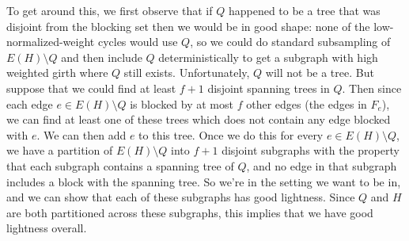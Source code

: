\documentclass{article}
\theoremstyle{plain}
\theoremstyle{definition}
\begin{document}
To get around this, we first observe that if $Q$ happened to be a tree that was disjoint from the blocking set then we would be in good shape:  none of the low-normalized-weight cycles would use $Q$, so we could do standard subsampling of $E(H) \setminus Q$ and then include $Q$ deterministically to get a subgraph with high weighted girth where $Q$ still exists. Unfortunately, $Q$ will not be a tree.  But suppose that we could find at least $f+1$ disjoint spanning trees in $Q$.  Then since each edge $e \in E(H) \setminus Q$ is blocked by at most $f$ other edges (the edges in $F_e$), we can find at least one of these trees which does not contain any edge blocked with $e$.  We can then add $e$ to this tree.  Once we do this for every $e \in E(H) \setminus Q$, we have a partition of $E(H) \setminus Q$ into $f+1$ disjoint subgraphs with the property that each subgraph contains a spanning tree of $Q$, and no edge in that subgraph includes a block with the spanning tree.  So we're in the setting we want to be in, and we can show that each of these subgraphs has good lightness.  Since $Q$ and $H$ are both partitioned across these subgraphs, this implies that we have good lightness overall.
\end{document}
